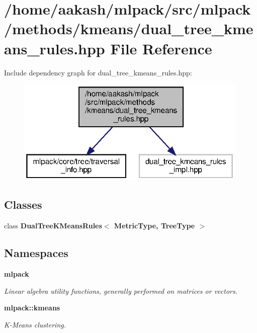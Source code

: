 \section{/home/aakash/mlpack/src/mlpack/methods/kmeans/dual\+\_\+tree\+\_\+kmeans\+\_\+rules.hpp File Reference}
\label{dual__tree__kmeans__rules_8hpp}
Include dependency graph for dual\+\_\+tree\+\_\+kmeans\+\_\+rules.\+hpp\+:
\nopagebreak
\begin{figure}[H]
\begin{center}
\leavevmode
\includegraphics[width=314pt]{dual__tree__kmeans__rules_8hpp__incl}
\end{center}
\end{figure}
\subsection*{Classes}
\begin{DoxyCompactItemize}
\item 
class \textbf{ Dual\+Tree\+K\+Means\+Rules$<$ Metric\+Type, Tree\+Type $>$}
\end{DoxyCompactItemize}
\subsection*{Namespaces}
\begin{DoxyCompactItemize}
\item 
 \textbf{ mlpack}
\begin{DoxyCompactList}\small\item\em Linear algebra utility functions, generally performed on matrices or vectors. \end{DoxyCompactList}\item 
 \textbf{ mlpack\+::kmeans}
\begin{DoxyCompactList}\small\item\em K-\/\+Means clustering. \end{DoxyCompactList}\end{DoxyCompactItemize}


